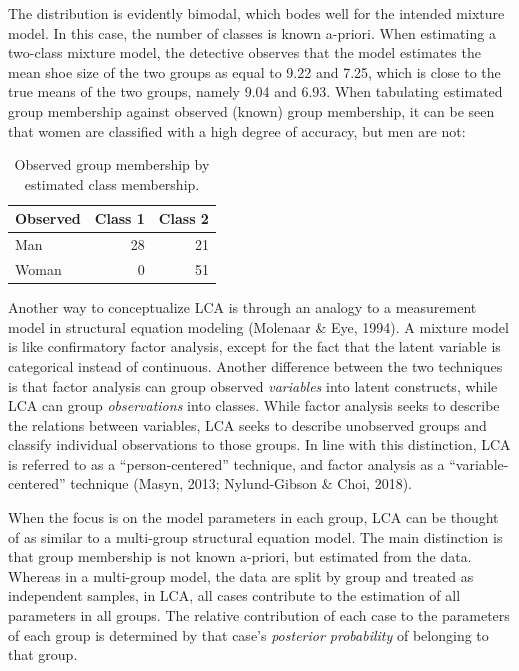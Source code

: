 \documentclass[
  ,man,floatsintext]{apa6}
\begin{document}
The distribution is evidently bimodal, which bodes well for the intended
mixture model. In this case, the number of classes is known a-priori.
When estimating a two-class mixture model, the detective observes that
the model estimates the mean shoe size of the two groups as equal to
9.22 and
7.25, which is close to the true
means of the two groups, namely 9.04
and 6.93. When tabulating estimated
group membership against observed (known) group membership, it can be
seen that women are classified with a high degree of accuracy, but men
are not:

\begin{table}

\caption{\label{tab:tabshoe}Observed group membership by estimated class membership.}
\centering
\begin{tabular}[t]{l|r|r}
\hline
Observed & Class 1 & Class 2\\
\hline
Man & 28 & 21\\
\hline
Woman & 0 & 51\\
\hline
\end{tabular}
\end{table}

Another way to conceptualize LCA is through an analogy to a measurement model in structural equation modeling (Molenaar \& Eye, 1994).
A mixture model is like confirmatory factor analysis,
except for the fact that the latent variable is categorical instead of continuous.
Another difference between the two techniques is that factor analysis can group observed \emph{variables} into latent constructs, while LCA can group \emph{observations} into classes.
While factor analysis seeks to describe the relations between variables,
LCA seeks to describe unobserved groups and classify individual observations to those groups.
In line with this distinction, LCA is referred to as a ``person-centered'' technique, and
factor analysis as a ``variable-centered'' technique
(Masyn, 2013; Nylund-Gibson \& Choi, 2018).

When the focus is on the model parameters in each group, LCA can be
thought of as similar to a multi-group structural equation model. The
main distinction is that group membership is not known a-priori, but estimated from the data.
Whereas in a multi-group model, the data are split by group and treated
as independent samples, in LCA, all cases contribute to the estimation
of all parameters in all groups. The relative contribution of each case
to the parameters of each group is determined by that case's \emph{posterior
probability} of belonging to that group.
\end{document}
